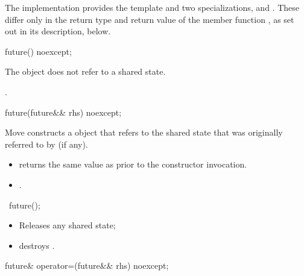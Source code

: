\pnum
The implementation provides the template  and two specializations,
 and . These differ only in the return type and return
value of the member function , as set out in its description, below.

%
\begin{itemdecl}
future() noexcept;
\end{itemdecl}

\begin{itemdescr}
\pnum
\effects
The object does not refer to a shared state.

\pnum
\ensures
{}.
\end{itemdescr}

%
\begin{itemdecl}
future(future&& rhs) noexcept;
\end{itemdecl}

\begin{itemdescr}
\pnum
\effects
Move constructs a  object that refers to the shared
state that
was originally referred to by  (if any).

\pnum
\ensures
\begin{itemize}
\item {} returns the same value as  prior to the
constructor invocation.
\item {}.
\end{itemize}
\end{itemdescr}

%
\begin{itemdecl}
~future();
\end{itemdecl}

\begin{itemdescr}
\pnum
\effects
\begin{itemize}
\item
Releases any shared state;
\item
destroys .
\end{itemize}
\end{itemdescr}

%
\begin{itemdecl}
future& operator=(future&& rhs) noexcept;
\end{itemdecl}

